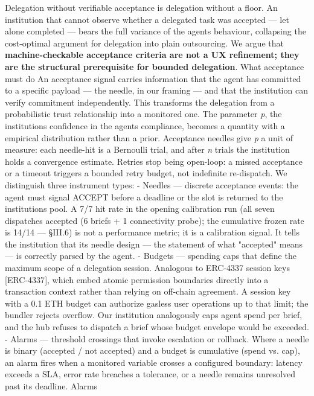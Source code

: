 \documentclass[
]{article}
\begin{document}
Delegation without verifiable acceptance is delegation without a floor.
An institution that cannot observe whether a delegated task was accepted
--- let alone completed --- bears the full variance of the
agent\textquotesingle s behaviour, collapsing the cost-optimal argument
for delegation into plain outsourcing. We argue that
\textbf{machine-checkable acceptance criteria are not a UX refinement;
they are the structural prerequisite for bounded delegation}. What
acceptance must do An acceptance signal carries information that the
agent has committed to a specific payload --- the needle, in our framing
--- and that the institution can verify commitment independently. This
transforms the delegation from a probabilistic trust relationship into a
monitored one. The parameter \emph{p}, the institution\textquotesingle s
confidence in the agent\textquotesingle s compliance, becomes a quantity
with a empirical distribution rather than a prior. Acceptance needles
give \emph{p} a unit of measure: each needle-hit is a Bernoulli trial,
and after \emph{n} trials the institution holds a convergence estimate.
Retries stop being open-loop: a missed acceptance or a timeout triggers
a bounded retry budget, not indefinite re-dispatch. We distinguish three
instrument types: - Needles --- discrete acceptance events: the agent
must signal ACCEPT before a deadline or the slot is returned to the
institution\textquotesingle s pool. A 7/7 hit rate in the opening
calibration run (all seven dispatches accepted (6 briefs + 1
connectivity probe); the cumulative frozen rate is 14/14 --- \S{}III.6) is
not a performance metric; it is a calibration signal. It tells the
institution that its needle design --- the statement of what "accepted"
means --- is correctly parsed by the agent. - Budgets --- spending caps
that define the maximum scope of a delegation session. Analogous to
ERC-4337 session keys {[}ERC-4337{]}, which embed atomic permission
boundaries directly into a transaction context rather than relying on
off-chain agreement. A session key with a 0.1 ETH budget can authorize
gasless user operations up to that limit; the bundler rejects overflow.
Our institution analogously caps agent spend per brief, and the hub
refuses to dispatch a brief whose budget envelope would be exceeded. -
Alarms --- threshold crossings that invoke escalation or rollback. Where
a needle is binary (accepted / not accepted) and a budget is cumulative
(spend vs. cap), an alarm fires when a monitored variable crosses a
configured boundary: latency exceeds a SLA, error rate breaches a
tolerance, or a needle remains unresolved past its deadline. Alarms
\end{document}
